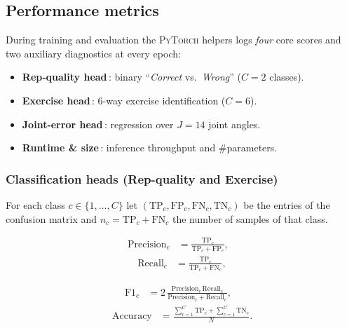 \documentclass{article}
\begin{document}
\subsection{Performance metrics}
\label{sec:metrics}

During training and evaluation the \textsc{PyTorch} helpers logs \emph{four} core scores and two
auxiliary diagnostics at every epoch:

\begin{itemize}[leftmargin=1.5em]
  \item \textbf{Rep‐quality head}\,: binary “\emph{Correct} vs.\ \emph{Wrong}”
        ($C\!=\!2$ classes).
  \item \textbf{Exercise head}\,: 6-way exercise identification
        ($C\!=\!6$).
  \item \textbf{Joint-error head}\,: regression over $J\!=\!14$ joint angles.
  \item \textbf{Runtime \& size}\,: inference throughput and \#parameters.
\end{itemize}

\vspace{.5em}
\subsubsection{Classification heads (Rep-quality and Exercise)}

For each class $c\in\{1,\dots,C\}$ let
$(\text{TP}_c,\text{FP}_c,\text{FN}_c,\text{TN}_c)$ be the entries of
the confusion matrix and $n_c=\text{TP}_c+\text{FN}_c$ the number of
samples of that class.

\begin{align}
  \text{Precision}_c
  &=\frac{\text{TP}_c}{\text{TP}_c+\text{FP}_c},            & \end{align}
  \begin{align} \text{Recall}_c
  &=\frac{\text{TP}_c}{\text{TP}_c+\text{FN}_c},
  \label{eq:prec_recall}
\end{align}

\begin{align}
  \text{F1}_c &= 2\,
      \frac{\text{Precision}_c \,\text{Recall}_c}
           {\text{Precision}_c+\text{Recall}_c},           & \end{align}
  \begin{align} \text{Accuracy} &= \frac{\sum_{c=1}^{C}\text{TP}_c +
                            \sum_{c=1}^{C}\text{TN}_c}{N}.
  \label{eq:f1_acc}
\end{align}
\end{document}
